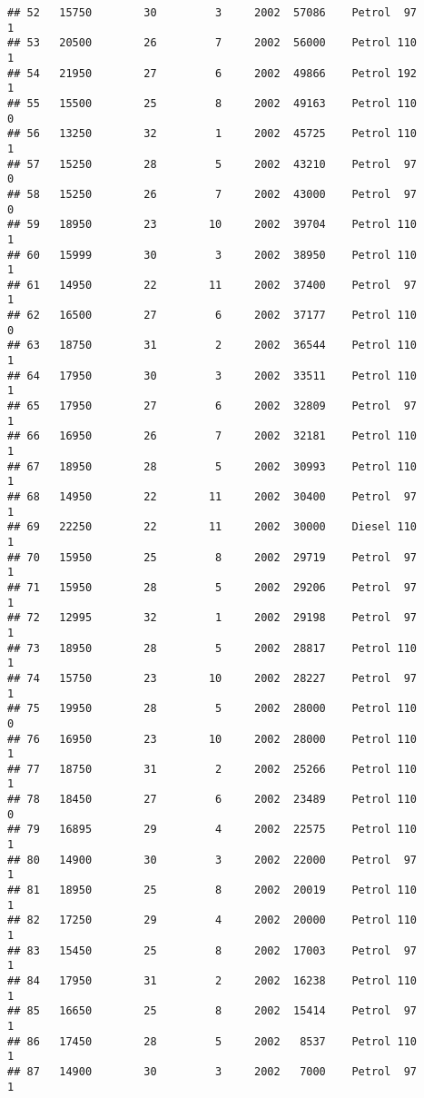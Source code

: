 \documentclass[]{article}
\begin{document}
\begin{verbatim}
## 52   15750        30         3     2002  57086    Petrol  97         1
## 53   20500        26         7     2002  56000    Petrol 110         1
## 54   21950        27         6     2002  49866    Petrol 192         1
## 55   15500        25         8     2002  49163    Petrol 110         0
## 56   13250        32         1     2002  45725    Petrol 110         1
## 57   15250        28         5     2002  43210    Petrol  97         0
## 58   15250        26         7     2002  43000    Petrol  97         0
## 59   18950        23        10     2002  39704    Petrol 110         1
## 60   15999        30         3     2002  38950    Petrol 110         1
## 61   14950        22        11     2002  37400    Petrol  97         1
## 62   16500        27         6     2002  37177    Petrol 110         0
## 63   18750        31         2     2002  36544    Petrol 110         1
## 64   17950        30         3     2002  33511    Petrol 110         1
## 65   17950        27         6     2002  32809    Petrol  97         1
## 66   16950        26         7     2002  32181    Petrol 110         1
## 67   18950        28         5     2002  30993    Petrol 110         1
## 68   14950        22        11     2002  30400    Petrol  97         1
## 69   22250        22        11     2002  30000    Diesel 110         1
## 70   15950        25         8     2002  29719    Petrol  97         1
## 71   15950        28         5     2002  29206    Petrol  97         1
## 72   12995        32         1     2002  29198    Petrol  97         1
## 73   18950        28         5     2002  28817    Petrol 110         1
## 74   15750        23        10     2002  28227    Petrol  97         1
## 75   19950        28         5     2002  28000    Petrol 110         0
## 76   16950        23        10     2002  28000    Petrol 110         1
## 77   18750        31         2     2002  25266    Petrol 110         1
## 78   18450        27         6     2002  23489    Petrol 110         0
## 79   16895        29         4     2002  22575    Petrol 110         1
## 80   14900        30         3     2002  22000    Petrol  97         1
## 81   18950        25         8     2002  20019    Petrol 110         1
## 82   17250        29         4     2002  20000    Petrol 110         1
## 83   15450        25         8     2002  17003    Petrol  97         1
## 84   17950        31         2     2002  16238    Petrol 110         1
## 85   16650        25         8     2002  15414    Petrol  97         1
## 86   17450        28         5     2002   8537    Petrol 110         1
## 87   14900        30         3     2002   7000    Petrol  97         1

\end{verbatim}
\end{document}
